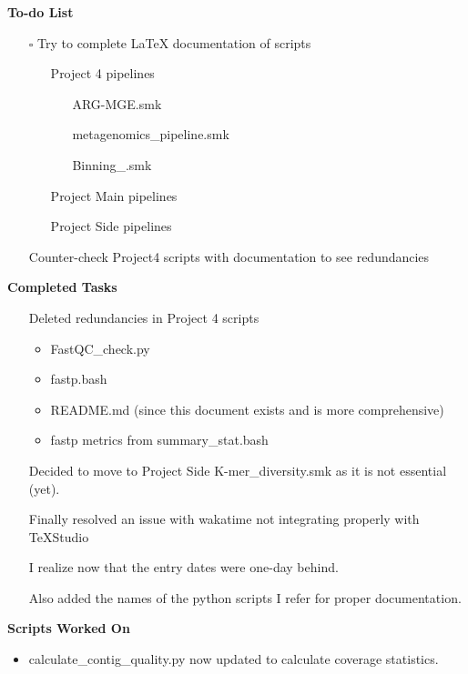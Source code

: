 \documentclass[11pt]{report}
\newcommand{\done}{\checkmark}
\newcommand{\pending}{$\square$}
\newcommand{\moved}{\faArrowCircleRight}
\begin{document}
{\textbf{To-do List}
\begin{itemize}
	\item [\pending] Try to complete LaTeX documentation of scripts
	
	\begin{itemize}
		\item [\done] Project 4 pipelines
			\begin{itemize}
				\item [\done] ARG-MGE.smk
				\item [\done] metagenomics\_pipeline.smk
				\item [\done] Binning\_.smk
			\end{itemize}
		\item [\moved] Project Main pipelines
		\item [\moved] Project Side pipelines
		
	
\end{itemize}
	\item [\done] Counter-check Project4 scripts with documentation to see redundancies
\end{itemize}

\textbf{Completed Tasks}
\begin{itemize}
	\item [\done] Deleted redundancies in Project 4 scripts 
		\begin{itemize}
			\item FastQC\_check.py
			\item fastp.bash
			\item README.md (since this document exists and is more comprehensive)
			\item fastp metrics from summary\_stat.bash
		\end{itemize}
	\item [\done] Decided to move to Project Side K-mer\_diversity.smk as it is not essential (yet). 
	\item [\done] Finally resolved an issue with wakatime not integrating properly with TeXStudio
	\item [\done] I realize now that the entry dates were one-day behind.  
	\item [\done] Also added the names of the python scripts I refer for proper documentation. 
\end{itemize}

\textbf{Scripts Worked On}
\begin{itemize}
	\item calculate\_contig\_quality.py now updated to calculate coverage statistics. 
\end{itemize}


}
\end{document}
